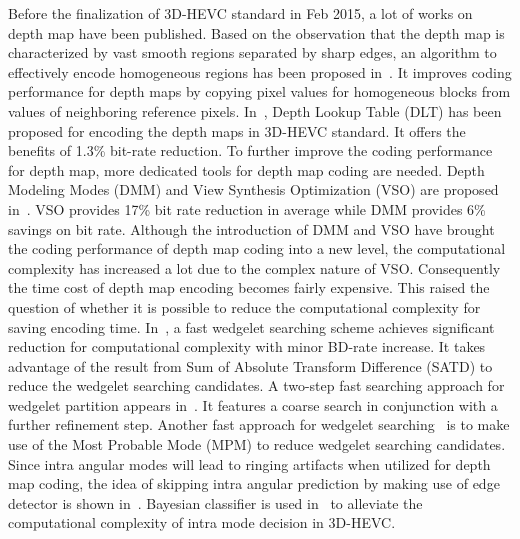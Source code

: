 Before the finalization of 3D-HEVC standard in Feb 2015, a lot of works on
depth map have been published.
%
Based on the observation that the depth map is characterized by vast
smooth regions separated by sharp edges, an algorithm to effectively
encode homogeneous regions has been proposed in~\parencite{RN120}.
It improves coding performance for depth maps by copying pixel values for
homogeneous blocks from values of neighboring reference pixels.
In~\parencite{RN123}, Depth Lookup Table (DLT) has been proposed for
encoding the depth maps in 3D-HEVC standard.
It offers the benefits of 1.3\% bit-rate reduction.
To further improve the coding performance for depth map, more
dedicated tools for depth map coding are needed.
Depth Modeling Modes (DMM) and View Synthesis Optimization (VSO) are proposed
in~\parencite{RN208}.
VSO provides 17\% bit rate reduction in average while DMM provides 6\% savings
on bit rate.
Although the introduction of DMM and VSO have brought the coding performance of
depth map coding into a new level, the computational complexity has increased
a lot due to the complex nature of VSO\@.
Consequently the time cost of depth map encoding becomes fairly expensive.
This raised the question of whether it is possible to reduce the computational
complexity for saving encoding time.
In~\parencite{RN76}, a fast wedgelet searching scheme achieves significant
reduction for computational complexity with minor BD-rate increase.
It takes advantage of the result from
Sum of Absolute Transform Difference (SATD) to reduce the wedgelet searching
candidates.
A two-step fast searching approach for wedgelet partition
appears in~\parencite{RN126}.
It features a coarse search in conjunction with a further refinement step.
Another fast approach for wedgelet searching~\parencite{RN79}
is to make use of the Most Probable Mode (MPM) to reduce wedgelet
searching candidates.
Since intra angular modes will lead to ringing artifacts
when utilized for depth map coding, the idea of skipping intra
angular prediction by making use of edge detector is shown in~\parencite{RN89}.
Bayesian classifier is used in~\parencite{RN102} to alleviate the computational
complexity of intra mode decision in 3D-HEVC\@.


